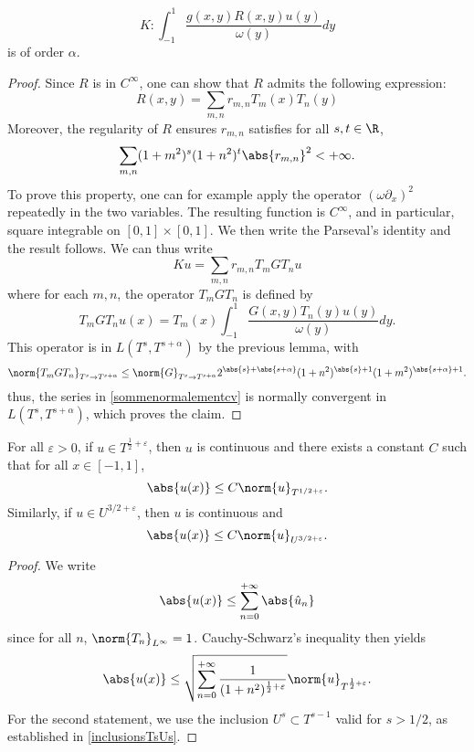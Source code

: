 \documentclass[a4paper]{article}
\begin{document}
\begin{Prop}
\begin{Lem}
			\[K : \int_{-1}^{1} \frac{g(x,y) R(x,y) u(y)}{\omega(y)}dy\]
			is of order $\alpha$. 
		\end{Lem}
		\begin{proof}
			Since $R$ is in $C^{\infty}$, one can show that $R$ admits the following expression:
			\begin{equation}
			R(x,y) = \sum_{m,n} r_{m,n} T_m(x) T_n(y)
			\label{sommenormalementcv}
			\end{equation}
			Moreover, the regularity of $R$ ensures $r_{m,n}$ satisfies for all $s,t \in \R$, 
			\[\sum_{m,n} (1 + m^2)^s (1 + n^2)^t\abs{r_{m,n}}^2 < +\infty.\] 
			To prove this property, one can for example apply the operator $(\omega \partial_x)^2$ repeatedly in the two variables. The resulting function is $C^\infty$, and in particular, square integrable on $[0,1] \times [0,1]$. We then write the Parseval's identity and the result follows. We can thus write 
			\[Ku = \sum_{m,n} r_{m,n} T_m G T_n u  \]
			where for each $m,n$, the operator $T_m G T_n$ is defined by 
			\[ T_m G T_n u (x)= T_m(x) \int_{-1}^{1} \dfrac{G(x,y) T_n(y)u(y)}{\omega(y)}dy.\]
			This operator is in $L(T^s,T^{s+\alpha})$ by the previous lemma, with 	
			\[\norm{T_m G T_n}_{T^s \to T^{s+\alpha}} \leq \norm{G}_{T^s \to T^{s + \alpha}} 2^{\abs{s} + \abs{s + \alpha}}(1 + n^2)^{\abs{s}+1}(1 + m^2)^{\abs{s+ \alpha} + 1}.\]
			thus, the series in \eqref{sommenormalementcv} is normally convergent in $L(T^s, T^{s + \alpha})$, which proves the claim. 
		\end{proof}
	\end{Prop}
	\begin{Lem}
		\label{LemInjectionsContinues}
		For all $\varepsilon >0$, if $u \in T^{\frac{1}{2} + \varepsilon}$, then $u$ is continuous and there exists a constant $C$ such that for all $x \in [-1,1]$,
		\[ \abs{u(x)} \leq C \norm{u}_{T^{1/2 + \varepsilon}}.\]	
		Similarly, if $u \in U^{3/2 + \varepsilon}$, then $u$ is continuous and 
		\[ \abs{u(x)} \leq C \norm{u}_{U^{3/2 + \varepsilon}}.\]
		\begin{proof}
			We write 
			\[\abs{u(x)} \leq \sum_{n = 0}^{+ \infty} \abs{\hat{u}_n}\]
			since for all $n$, $\norm{T_n}_{L^\infty} = 1$. Cauchy-Schwarz's inequality then yields
			\[\abs{u(x)} \leq \sqrt{\sum_{n= 0}^{+ \infty} \frac{1}{(1+ n^2)^{\frac{1}{2}+ \varepsilon}}} \norm{u}_{T^{\frac{1}{2} + \varepsilon}}.\]
			For the second statement, we use the inclusion $U^{s} \subset T^{s-1}$ valid for $s > 1/2$, as established in \autoref{inclusionsTsUs}. 
		\end{proof}	
	\end{Lem}
\end{document}
